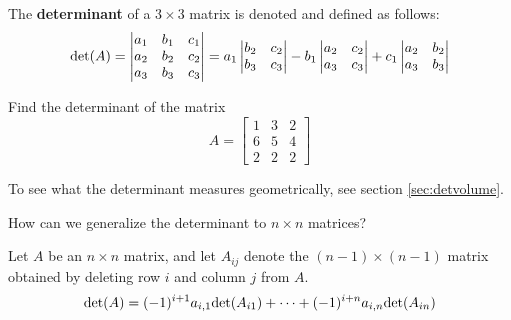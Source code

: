 \begin{definition}
    The \textbf{determinant} of a $3 \times 3$ matrix is denoted and defined as follows:
\begin{equation*}
\textnormal{det}(A) = 
\begin{vmatrix}
a_1 & b_1 & c_1 \\
a_2 & b_2 & c_2 \\
a_3 & b_3 & c_3 \\
\end{vmatrix} = a_1\begin{vmatrix}
b_2 & c_2 \\
b_3 & c_3
\end{vmatrix} - b_1\begin{vmatrix}
a_2 &  c_2 \\
a_3 &  c_3
\end{vmatrix} + c_1\begin{vmatrix}
a_2 & b_2 \\
a_3 & b_3 \\
\end{vmatrix}
\end{equation*}

    \end{definition}

\begin{example}\label{det3d}
    Find the determinant of the matrix \begin{equation*}
A = 
\begin{bmatrix}
1 & 3 & 2 \\
6 & 5 & 4 \\
2 & 2 & 2
\end{bmatrix}
\end{equation*}
\end{example}

To see what the determinant measures geometrically, see section \ref{sec:detvolume}.


\begin{motivating}
How can we generalize the determinant to $n \times n$ matrices?
\end{motivating}

\begin{theorem}\label{expansiondet}
    Let $A$ be an $n \times n$ matrix, and let $A_{ij}$ denote the $(n-1) \times (n-1)$ matrix obtained by deleting row $i$ and column $j$ from $A$.
    $$\textnormal{det}(A) = (-1)^{i+1}a_{i,1}\textnormal{det}(A_{i1}) + \cdots +  (-1)^{i+n}a_{i,n}\textnormal{det}(A_{in})$$
    
    \end{theorem}

